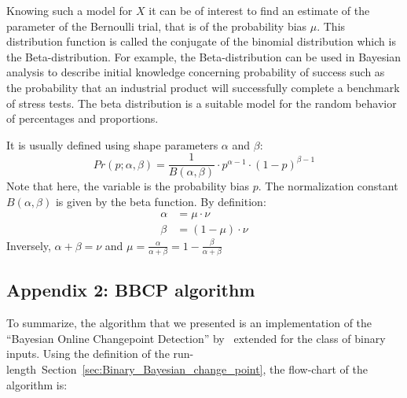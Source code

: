 \documentclass[12pt,english]{article}%
\newcommand{\eq}[1]{\begin{equation*}#1\end{equation*}}
\newcommand{\eqs}[1]{\begin{align*}#1\end{align*}}
\newcommand{\citet}[1]{\textcite{#1}}
\newcommand{\seeSec}[1]{Section~\ref{sec:#1}}
\begin{document}
Knowing such a model for $X$ it can be of interest to find an estimate of the parameter of the Bernoulli trial, that is of the probability bias $\mu$. This distribution function is called the conjugate of the binomial distribution which is the Beta-distribution. For example, the Beta-distribution can be used in Bayesian analysis to describe initial knowledge concerning probability of success such as the probability that an industrial product will successfully complete a benchmark of stress tests. The beta distribution is a suitable model for the random behavior of percentages and proportions.

It is usually defined using shape parameters $\alpha$ and $\beta$:
\eq{
Pr(p ; \alpha, \beta ) = \frac{1}{B(\alpha, \beta)} \cdot p^{\alpha -1} \cdot (1-p)^{\beta - 1} 
}
Note that here, the variable is the probability bias $p$. The normalization constant $B(\alpha, \beta)$ is given by the beta function. By definition:
\eqs{
        \alpha &= \mu \cdot \nu \\
        \beta  &= (1-\mu) \cdot \nu
    }
Inversely, $\alpha + \beta = \nu$ and $\mu = \frac{\alpha}{\alpha +\beta} = 1- \frac{\beta}{\alpha + \beta}$


\subsection{Appendix 2: BBCP algorithm}
\label{app:bcp}

To summarize, the algorithm that we presented is an implementation of the  ``Bayesian Online Changepoint Detection'' by~\citet{AdamsMackay2007}
extended for the class of binary inputs. Using the definition of the run-length~\seeSec{Binary_Bayesian_change_point}, the flow-chart of the algorithm is:
\end{document}
